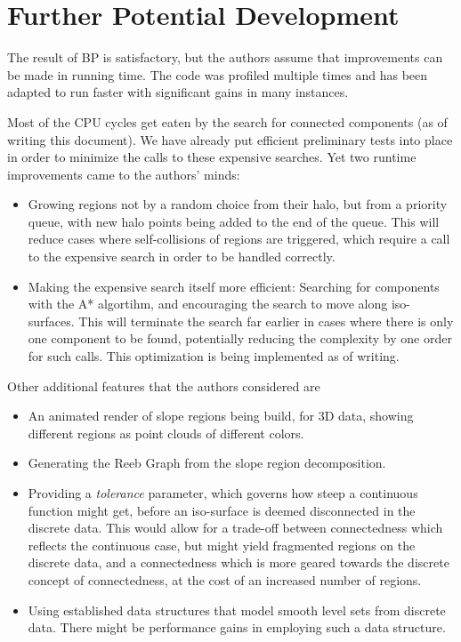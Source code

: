 \documentclass[a4paper,12pt,notitlepage,fullpage]{paper}
\theoremstyle{plain}
\theoremstyle{definition}
\begin{document}
\section{Further Potential Development}
The result of BP is satisfactory, but the authors assume that improvements can be made in running time. The code was profiled multiple times and has been adapted to run faster with significant gains in many instances.

Most of the CPU cycles get eaten by the search for connected components (as of writing this document). We have already put efficient preliminary tests into place in order to minimize the calls to these expensive searches. Yet two runtime improvements came to the authors' minds:
\begin{itemize}
\item Growing regions not by a random choice from their halo, but from a priority queue, with new halo points being added to the end of the queue. This will reduce cases where self-collisions of regions are triggered, which require a call to the expensive search in order to be handled correctly.
\item Making the expensive search itself more efficient: Searching for components with the A* algortihm, and encouraging the search to move along iso-surfaces. This will terminate the search far earlier in cases where there is only one component to be found, potentially reducing the complexity by one order for such calls. This optimization is being implemented as of writing.
\end{itemize}

Other additional features that the authors considered are
\begin{itemize}
\item An animated render of slope regions being build, for 3D data, showing different regions as point clouds of different colors.
\item Generating the Reeb Graph from the slope region decomposition.
\item Providing a \emph{tolerance} parameter, which governs how steep a continuous function might get, before an iso-surface is deemed disconnected in the discrete data. This would allow for a trade-off between connectedness which reflects the continuous case, but might yield fragmented regions on the discrete data, and a connectedness which is more geared towards the discrete concept of connectedness, at the cost of an increased number of regions.
\item Using established data structures that model smooth level sets from discrete data. There might be performance gains in employing such a data structure.
\end{itemize}
\end{document}
